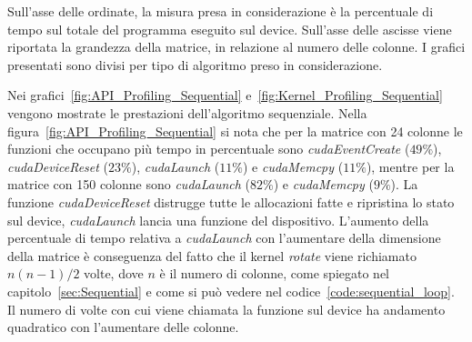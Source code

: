 Sull'asse delle ordinate, la misura presa in considerazione è la percentuale di tempo sul totale del programma eseguito sul device. Sull'asse delle ascisse viene riportata la grandezza della matrice, in relazione al numero delle colonne. I grafici presentati sono divisi per tipo di algoritmo preso in considerazione.

Nei grafici~\ref{fig:API_Profiling_Sequential} e~\ref{fig:Kernel_Profiling_Sequential} vengono mostrate le prestazioni dell'algoritmo sequenziale. Nella figura~\ref{fig:API_Profiling_Sequential} si nota che per la matrice con 24 colonne le funzioni che occupano più tempo in percentuale sono \textit{cudaEventCreate} ($49\%$), \textit{cudaDeviceReset} ($23\%$), \textit{cudaLaunch} ($11\%$) e \textit{cudaMemcpy} ($11\%$), mentre per la matrice con 150 colonne sono \textit{cudaLaunch} ($82\%$) e \textit{cudaMemcpy} ($9\%$). La funzione \textit{cudaDeviceReset} distrugge tutte le allocazioni fatte e ripristina lo stato sul device, \textit{cudaLaunch} lancia una funzione del dispositivo. L'aumento della percentuale di tempo relativa a \textit{cudaLaunch} con l'aumentare della dimensione della matrice è conseguenza del fatto che il kernel \textit{rotate} viene richiamato $n(n-1)/2$ volte, dove $n$ è il numero di colonne, come spiegato nel capitolo~\ref{sec:Sequential} e come si può vedere nel codice~\ref{code:sequential_loop}. Il numero di volte con cui viene chiamata la funzione sul device ha andamento quadratico con l'aumentare delle colonne.

